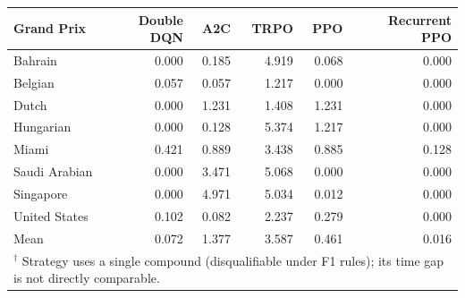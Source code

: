 \begin{tabular}{lrrrrr}
\toprule
Grand Prix & Double DQN & A2C & TRPO & PPO & Recurrent PPO \\
\midrule
Bahrain & 0.000 & 0.185 & 4.919 & 0.068 & 0.000 \\
Belgian & 0.057 & 0.057 & 1.217 & 0.000 & 0.000 \\
Dutch & 0.000 & 1.231 & 1.408 & 1.231 & 0.000 \\
Hungarian & 0.000 & 0.128 & 5.374 & 1.217 & 0.000 \\
Miami & 0.421 & 0.889 & 3.438 & 0.885 & 0.128 \\
Saudi Arabian & 0.000 & 3.471 & 5.068 & 0.000 & 0.000 \\
Singapore & 0.000 & 4.971 & 5.034 & 0.012 & 0.000 \\
United States & 0.102 & 0.082 & 2.237 & 0.279 & 0.000 \\
\midrule
Mean & 0.072 & 1.377 & 3.587 & 0.461 & 0.016 \\
\bottomrule
\multicolumn{6}{l}{\footnotesize $^\dagger$ Strategy uses a single compound (disqualifiable under F1 rules); its time gap is not directly comparable.} \\
\end{tabular}